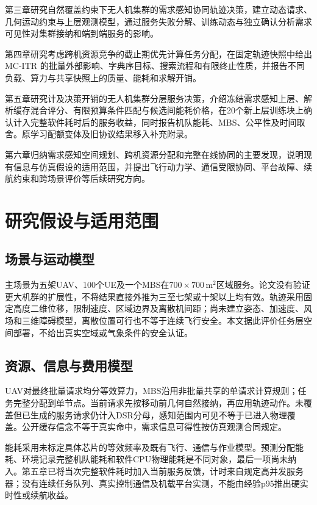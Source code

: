 第三章研究自然覆盖约束下无人机集群的需求感知协同轨迹决策，建立动态请求、几何运动约束与上层观测模型，通过服务失败分解、训练动态与独立确认分析需求可见性对集群接纳和端到端服务的影响。

第四章研究考虑跨机资源竞争的截止期优先计算任务分配，在固定轨迹快照中给出 MC-ITR 的批量外部影响、字典序目标、搜索流程和有限终止性质，并报告不同负载、算力与共享快照上的质量、能耗和求解开销。

第五章研究计及决策开销的无人机集群分层服务决策，介绍冻结需求感知上层、解析缓存混合评分、有限预算条件匹配与候选间能耗价格，在20个新上层训练块上确认计入完整软件耗时后的服务收益，同时报告机队能耗、MBS、公平性及时间取舍。原学习配额变体及旧协议结果移入补充附录。

第六章归纳需求感知空间规划、跨机资源分配和完整在线协同的主要发现，说明现有信息与仿真假设的适用范围，并提出飞行动力学、通信受限协同、平台故障、续航约束和跨场景评价等后续研究方向。

\section{研究假设与适用范围}
\label{sec:assumptions-and-scope}
\subsection{场景与运动模型}
\label{sec:scale-assumptions}
\label{sec:motion-assumptions}
主场景为五架UAV、100个UE及一个MBS在$700\times700\,\mathrm{m}^2$区域服务。论文没有验证更大机群的扩展性，不将结果直接外推为三至七架或十架以上均有效。轨迹采用固定高度二维位移，限制速度、区域边界及离散机间距；尚未建立姿态、加速度、风场和三维障碍模型，离散位置可行也不等于连续飞行安全。本文据此评价任务层空间部署，不给出真实空域或气象条件的安全认证。

\subsection{资源、信息与费用模型}
\label{sec:energy-assumptions}
\label{sec:timing-assumptions}
\label{sec:protocol-assumptions}
UAV对最终批量请求均分等效算力，MBS沿用非批量共享的单请求计算规则；任务完整分配到单节点。当前请求先按移动前几何自然接纳，再应用轨迹动作。未覆盖但已生成的服务请求仍计入DSR分母，感知范围内可见不等于已进入物理覆盖。公开缓存信念不等于真实命中，需求信息可得性按仿真观测合同规定。

能耗采用未标定具体芯片的等效频率及既有飞行、通信与作业模型。预测分配能耗、环境记录完整机队能耗和软件CPU物理能耗是不同对象，最后一项尚未纳入。第五章已将当次完整软件耗时加入当前服务反馈，计时来自规定高并发服务器；没有连续任务队列、真实控制通信及机载平台实测，不能由经验p95推出硬实时性或续航收益。

